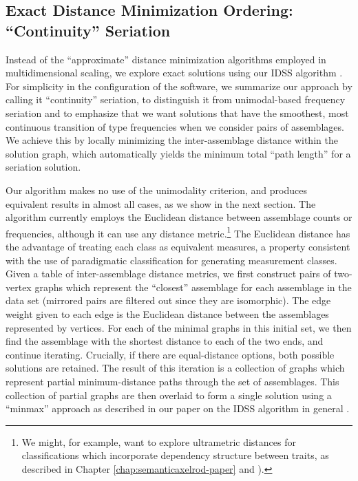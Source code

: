 \subsection{\texorpdfstring{Exact Distance Minimization Ordering:
``Continuity''
Seriation}{Exact Distance Minimization Ordering: Continuity Seriation}}\label{exact-distance-minimization-ordering-continuity-seriation}

Instead of the ``approximate'' distance minimization algorithms employed
in multidimensional scaling, we explore exact solutions using our IDSS
algorithm \citep{Lipo2015}. For simplicity in the configuration of the software, we
summarize our approach by calling it ``continuity'' seriation, to
distinguish it from unimodal-based frequency seriation and to emphasize
that we want solutions that have the smoothest, most continuous
transition of type frequencies when we consider pairs of assemblages. We
achieve this by locally minimizing the inter-assemblage distance within
the solution graph, which automatically yields the minimum total ``path
length'' for a seriation solution.

Our algorithm makes no use of the unimodality criterion, and produces
equivalent results in almost all cases, as we show in the next section.
The algorithm currently employs the Euclidean distance between
assemblage counts or frequencies, although it can use any distance
metric.\footnote{We might, for example, want to explore ultrametric distances for classifications which incorporate 
dependency structure between traits, as described in Chapter \ref{chap:semanticaxelrod-paper} and \citet{mesoudi2008learning}).}  
The Euclidean distance has the advantage of treating each class
as equivalent measures, a property consistent with the use of
paradigmatic classification \citep[sensu][]{Dunnell1971} for generating
measurement classes. Given a table of inter-assemblage distance metrics,
we first construct pairs of two-vertex graphs which represent the
``closest'' assemblage for each assemblage in the data set (mirrored
pairs are filtered out since they are isomorphic). The edge weight given
to each edge is the Euclidean distance between the assemblages
represented by vertices. For each of the minimal graphs in this initial
set, we then find the assemblage with the shortest distance to each of
the two ends, and continue iterating. Crucially, if there are
equal-distance options, both possible solutions are retained. The result
of this iteration is a collection of graphs which represent partial
minimum-distance paths through the set of assemblages. This collection
of partial graphs are then overlaid to form a single solution using a
``minmax'' approach as described in our paper on the IDSS algorithm in
general \citep{lipomadsendunnell2015}.

